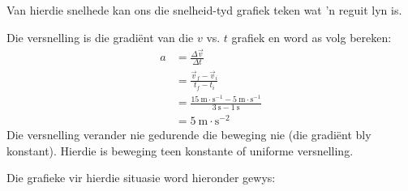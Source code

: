 Van hierdie snelhede kan ons die snelheid-tyd grafiek teken wat 'n reguit lyn is.\par
Die versnelling is die gradi\"ent van die $v$ vs. $t$ grafiek en word as volg bereken:
\begin{align*}
    a&= \frac{\Delta \vec{v}}{\Delta t} \\ 
    &= \frac{\vec{v}_{f}-\vec{v}_{i}}{{t}_{f}-{t}_{i}}\\ 
    &= \frac{15~\text{m}\ensuremath{\cdot}{\text{s}}^{-1}-5~\text{m}\ensuremath{\cdot}{\text{s}}^{-1}}{3~\text{s}-1~\text{s}}\\ 
    &= 5~\text{m}\ensuremath{\cdot}{\text{s}}^{-2}
\end{align*}
Die versnelling verander nie gedurende die beweging nie (die gradi\"ent bly konstant). Hierdie is beweging teen konstante of uniforme versnelling. \par

Die grafieke vir hierdie situasie word hieronder gewys:
    
